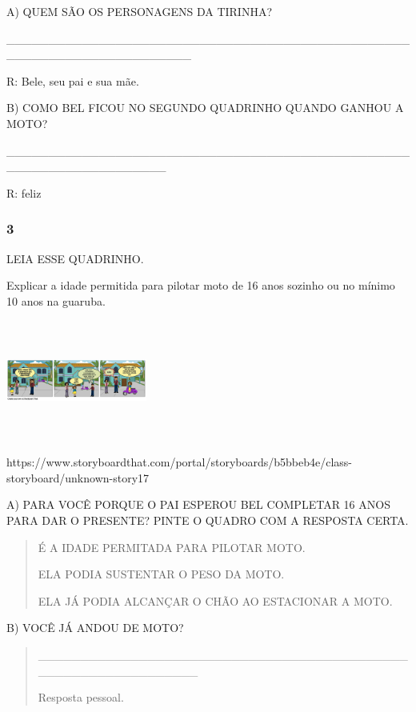 A) QUEM SÃO OS PERSONAGENS DA TIRINHA?

\_\_\_\_\_\_\_\_\_\_\_\_\_\_\_\_\_\_\_\_\_\_\_\_\_\_\_\_\_\_\_\_\_\_\_\_\_\_\_\_\_\_\_\_\_\_\_\_\_\_\_\_\_\_\_\_\_\_\_\_\_\_\_\_\_\_\_\_\_\_

R: Bele, seu pai e sua mãe.

B) COMO BEL FICOU NO SEGUNDO QUADRINHO QUANDO GANHOU A MOTO?

\_\_\_\_\_\_\_\_\_\_\_\_\_\_\_\_\_\_\_\_\_\_\_\_\_\_\_\_\_\_\_\_\_\_\_\_\_\_\_\_\_\_\_\_\_\_\_\_\_\_\_\_\_\_\_\_\_\_\_\_\_\_\_\_\_\_\_

R: feliz

\subsubsection{3 }\label{section-83}

LEIA ESSE QUADRINHO.

Explicar a idade permitida para pilotar moto de 16 anos sozinho ou no
mínimo 10 anos na guaruba.

\includegraphics[width=1.82014in,height=1.55486in]{media/image130.png}

https://www.storyboardthat.com/portal/storyboards/b5bbeb4e/class-storyboard/unknown-story17

A) PARA VOCÊ PORQUE O PAI ESPEROU BEL COMPLETAR 16 ANOS PARA DAR O
PRESENTE? PINTE O QUADRO COM A RESPOSTA CERTA.

\begin{quote}
É A IDADE PERMITADA PARA PILOTAR MOTO.

ELA PODIA SUSTENTAR O PESO DA MOTO.

ELA JÁ PODIA ALCANÇAR O CHÃO AO ESTACIONAR A MOTO.
\end{quote}

B) VOCÊ JÁ ANDOU DE MOTO?

\begin{quote}
\_\_\_\_\_\_\_\_\_\_\_\_\_\_\_\_\_\_\_\_\_\_\_\_\_\_\_\_\_\_\_\_\_\_\_\_\_\_\_\_\_\_\_\_\_\_\_\_\_\_\_\_\_\_\_\_\_\_\_\_\_\_\_

Resposta pessoal.
\end{quote}

